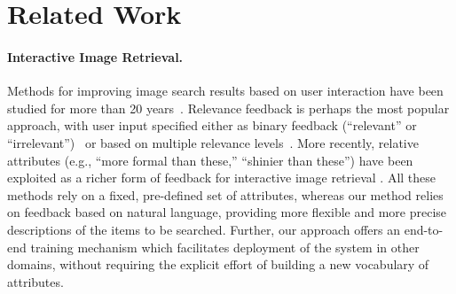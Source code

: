 \section{Related Work}

\paragraph{Interactive Image Retrieval.}  Methods for improving image search results based on user interaction have been studied for more than 20 years~\cite{flickner1995query,thomee2012interactive,rui1999image}. Relevance feedback is perhaps the most popular approach, with user input specified either as binary feedback (``relevant'' or ``irrelevant'')~\cite{rui1998relevance} or based on multiple relevance levels~\cite{wu2004willhunter}. More recently, relative attributes (e.g., ``more formal than these,'' ``shinier than these'') have been exploited as a richer form of feedback for interactive image retrieval \cite{kovashka2012,kovashka2017attributes,kovashka2013attribute,parikh2011relative,yu2017fine}. 
All these methods rely on a fixed, pre-defined set of attributes, whereas our method relies on feedback based on natural language, providing more flexible and more precise descriptions of the items to be searched. Further, our approach offers an end-to-end training mechanism which facilitates deployment of the system in other domains, without requiring the explicit effort of building a new vocabulary of attributes.

